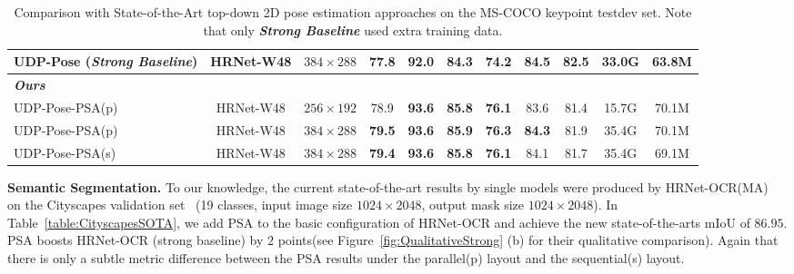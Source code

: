 \documentclass[10pt,twocolumn,letterpaper]{article}
\begin{document}
\begin{table*}[t]
\begin{tabular}{l|c|c|c|ccccc|c|c}
UDP-Pose \cite{Huang2020} (\textbf{\textsl{Strong Baseline}}) & HRNet-W48 & $384\times288$ & 77.8 & 92.0 &84.3 &74.2  &\textbf{84.5}  & \textbf{82.5} &33.0G &63.8M\\
\hline
\textbf{\textit{Ours}} & & & & & & & & && \\
UDP-Pose-PSA(p)      & HRNet-W48   & $256\times192$  & 78.9 & \textbf{93.6} & \textbf{85.8} & \textbf{76.1} & 83.6 &  81.4 & 15.7G & 70.1M  \\
UDP-Pose-PSA(p)      & HRNet-W48  & $384\times288$ & \textbf{79.5} & \textbf{93.6} & \textbf{85.9} & \textbf{76.3} & \textbf{84.3} & 81.9 &35.4G &70.1M  \\
UDP-Pose-PSA(s)      & HRNet-W48  & $384\times288$ & \textbf{79.4} & \textbf{93.6} & \textbf{85.8} & \textbf{76.1} & 84.1 & 81.7 &35.4G &69.1M  \\
 \hline
\end{tabular}
\caption{ Comparison with State-of-the-Art top-down 2D pose estimation approaches on the MS-COCO keypoint testdev set. Note that only \cite{Huang2020}\textbf{\textsl{Strong Baseline}} used extra training data.}
\label{table:CocoSOTA}
\end{table*}


\textbf{Semantic Segmentation.} To our knowledge, the current state-of-the-art results by single models were produced by HRNet-OCR(MA)~\cite{Tao2020} on the Cityscapes validation set {~\cite{Cordts16}}(19 classes, input image size $1024 \times 2048$, output mask size $1024\times 2048$). In Table~\ref{table:CityscapesSOTA}, we add PSA to the basic configuration of HRNet-OCR and achieve the new state-of-the-arts mIoU of $86.95$. PSA boosts HRNet-OCR (strong baseline) by $2$ points(see Figure~\ref{fig:QualitativeStrong} (b) for their qualitative comparison). Again that there is only a subtle metric difference between the PSA results under the parallel(p) layout and the sequential(s) layout.
\end{document}
